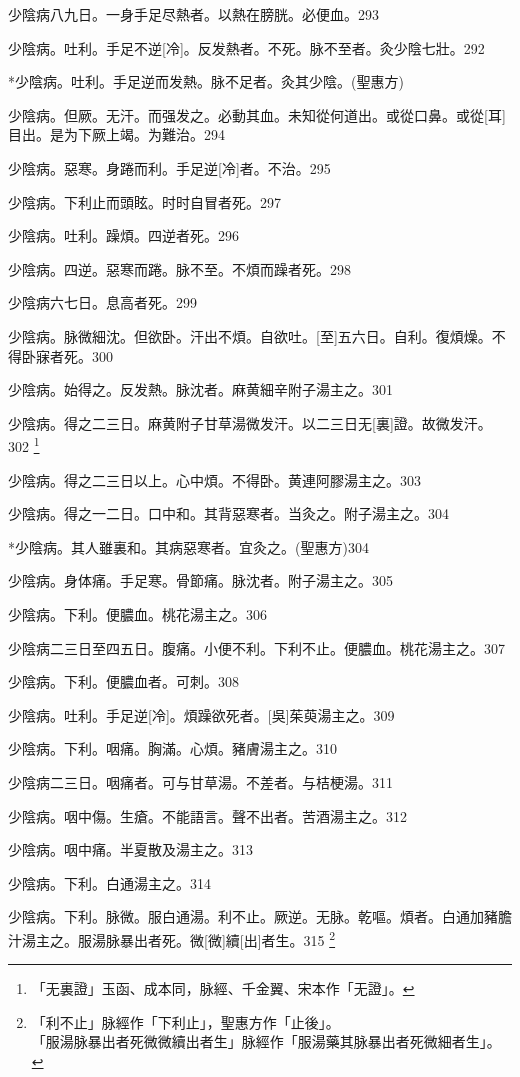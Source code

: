 \documentclass[12pt,twoside,UTF8,b5paper]{ctexbook}
\begin{document}
少陰病八九日。一身手足尽熱者。以熱在膀胱。必便血。293

少陰病。吐利。手足不逆[冷]。反发熱者。不死。脉不至者。灸少陰七壯。292

*少陰病。吐利。手足逆而发熱。脉不足者。灸其少陰。(聖惠方)

少陰病。但厥。无汗。而强发之。必動其血。未知從何道出。或從口鼻。或從[耳]目出。是为下厥上竭。为難治。294

少陰病。惡寒。身踡而利。手足逆[冷]者。不治。295

少陰病。下利止而頭眩。时时自冒者死。297

少陰病。吐利。躁煩。四逆者死。296

少陰病。四逆。惡寒而踡。脉不至。不煩而躁者死。298

少陰病六七日。息高者死。299

少陰病。脉微細沈。但欲卧。汗出不煩。自欲吐。[至]五六日。自利。復煩燥。不得卧寐者死。300

少陰病。始得之。反发熱。脉沈者。麻黄細辛附子湯主之。301

少陰病。得之二三日。麻黄附子甘草湯微发汗。以二三日无[裏]證。故微发汗。302
	\footnote{「无裏證」玉函、成本同，脉經、千金翼、宋本作「无證」。}

少陰病。得之二三日以上。心中煩。不得卧。黄連阿膠湯主之。303

少陰病。得之一二日。口中和。其背惡寒者。当灸之。附子湯主之。304

*少陰病。其人雖裏和。其病惡寒者。宜灸之。(聖惠方)304

少陰病。身体痛。手足寒。骨節痛。脉沈者。附子湯主之。305

少陰病。下利。便膿血。桃花湯主之。306

少陰病二三日至四五日。腹痛。小便不利。下利不止。便膿血。桃花湯主之。307

少陰病。下利。便膿血者。可刺。308

少陰病。吐利。手足逆[冷]。煩躁欲死者。[吳]茱萸湯主之。309

少陰病。下利。咽痛。胸滿。心煩。豬膚湯主之。310

少陰病二三日。咽痛者。可与甘草湯。不差者。与桔梗湯。311

少陰病。咽中傷。生瘡。不能語言。聲不出者。苦酒湯主之。312

少陰病。咽中痛。半夏散及湯主之。313

少陰病。下利。白通湯主之。314

少陰病。下利。脉微。服白通湯。利不止。厥逆。无脉。乾嘔。煩者。白通加豬膽汁湯主之。服湯脉暴出者死。微[微]續[出]者生。315
	\footnote{「利不止」脉經作「下利止」，聖惠方作「止後」。\\「服湯脉暴出者死微微續出者生」脉經作「服湯藥其脉暴出者死微細者生」。}
\end{document}
